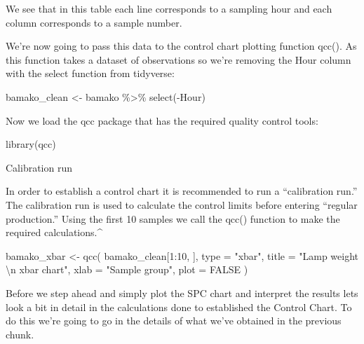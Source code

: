 \documentclass[
]{book}
\newenvironment{Shaded}{\begin{snugshade}}{\end{snugshade}}
\newcommand{\AttributeTok}[1]{\textcolor[rgb]{0.77,0.63,0.00}{#1}}
\newcommand{\ConstantTok}[1]{\textcolor[rgb]{0.00,0.00,0.00}{#1}}
\newcommand{\DecValTok}[1]{\textcolor[rgb]{0.00,0.00,0.81}{#1}}
\newcommand{\FunctionTok}[1]{\textcolor[rgb]{0.00,0.00,0.00}{#1}}
\newcommand{\NormalTok}[1]{#1}
\newcommand{\OtherTok}[1]{\textcolor[rgb]{0.56,0.35,0.01}{#1}}
\newcommand{\SpecialCharTok}[1]{\textcolor[rgb]{0.00,0.00,0.00}{#1}}
\newcommand{\StringTok}[1]{\textcolor[rgb]{0.31,0.60,0.02}{#1}}
\begin{document}
We see that in this table each line corresponds to a sampling hour and each column corresponds to a sample number.

We're now going to pass this data to the control chart plotting function qcc(). As this function takes a dataset of observations so we're removing the Hour column with the select function from tidyverse:

\begin{Shaded}
\begin{Highlighting}[]
\NormalTok{bamako\_clean }\OtherTok{\textless{}{-}}\NormalTok{ bamako }\SpecialCharTok{\%\textgreater{}\%} 
  \FunctionTok{select}\NormalTok{(}\SpecialCharTok{{-}}\NormalTok{Hour) }
\end{Highlighting}
\end{Shaded}

Now we load the qcc package that has the required quality control tools:

\begin{Shaded}
\begin{Highlighting}[]
\FunctionTok{library}\NormalTok{(qcc)}
\end{Highlighting}
\end{Shaded}

Calibration run

In order to establish a control chart it is recommended to run a ``calibration run.'' The calibration run is used to calculate the control limits before entering ``regular production.'' Using the first 10 samples we call the qcc() function to make the required calculations.\^{}

\begin{Shaded}
\begin{Highlighting}[]
\NormalTok{bamako\_xbar }\OtherTok{\textless{}{-}} \FunctionTok{qcc}\NormalTok{(}
\NormalTok{  bamako\_clean[}\DecValTok{1}\SpecialCharTok{:}\DecValTok{10}\NormalTok{, ], }
  \AttributeTok{type =} \StringTok{"xbar"}\NormalTok{, }
  \AttributeTok{title =} \StringTok{"Lamp weight }\SpecialCharTok{\textbackslash{}n}\StringTok{ xbar chart"}\NormalTok{, }
  \AttributeTok{xlab =} \StringTok{"Sample group"}\NormalTok{,}
  \AttributeTok{plot =} \ConstantTok{FALSE}
\NormalTok{  )}
\end{Highlighting}
\end{Shaded}

Before we step ahead and simply plot the SPC chart and interpret the results lets look a bit in detail in the calculations done to established the Control Chart. To do this we're going to go in the details of what we've obtained in the previous chunk.
\end{document}

